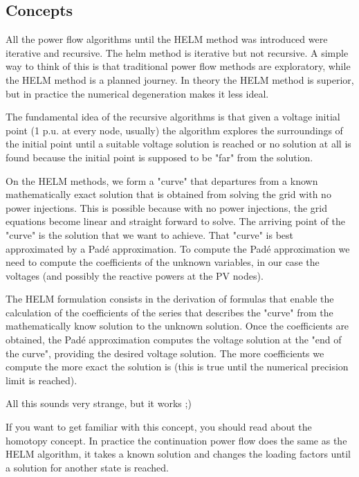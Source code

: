 \documentclass[nols,a4paper,twoside,notoc,fleqn]{tufte-book}
\begin{document}
\subsection{Concepts}

All the power flow algorithms until the HELM method was introduced were iterative and recursive. The helm method is iterative but not recursive. A simple way to think of this is that traditional power flow methods are exploratory, while the HELM method is a planned journey. In theory the HELM method is superior, but in practice the numerical degeneration makes it less ideal.

The fundamental idea of the recursive algorithms is that given a voltage initial point (1 p.u. at every node, usually) the algorithm explores the surroundings of the initial point until a suitable voltage solution is reached or no solution at all is found because the initial point is supposed to be "far" from the solution.

On the HELM methods, we form a "curve" that departures from a known mathematically exact solution that is obtained from solving the grid with no power injections. This is possible because with no power injections, the grid equations become linear and straight forward to solve. The arriving point of the "curve" is the solution that we want to achieve. That "curve" is best approximated by a Pad\'e approximation. To compute the Pad\'e approximation we need to compute the coefficients of the unknown variables, in our case the voltages (and possibly the reactive powers at the PV nodes).

The HELM formulation consists in the derivation of formulas that enable the calculation of the coefficients of the series that describes the "curve" from the mathematically know solution to the unknown solution. Once the coefficients are obtained, the Pad\'e approximation computes the voltage solution at the "end of the curve", providing the desired voltage solution. The more coefficients we compute the more exact the solution is (this is true until the numerical precision limit is reached).\newline 


All this sounds very strange, but it works ;)\newline 


If you want to get familiar with this concept, you should read about the homotopy concept. In practice the continuation power flow does the same as the HELM algorithm, it takes a known solution and changes the loading factors until a solution for another state is reached.
\end{document}
